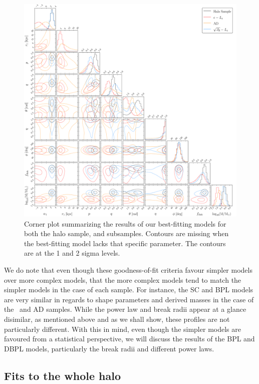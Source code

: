 \begin{figure}
    \centering
    \includegraphics[width=\textwidth]{figure/ch3/posterior.pdf}
    \caption{Corner plot summarizing the results of our best-fitting models for both the halo sample, and \gse subsamples. Contours are missing when the best-fitting model lacks that specific parameter. The contours are at the 1 and 2 sigma levels.}
    \label{ch3:fig:posterior}
\end{figure}

We do note that even though these goodness-of-fit criteria favour simpler models over more complex models, that the more complex models tend to match the simpler models in the case of each sample. For instance, the SC and BPL models are very similar in regards to shape parameters and derived masses in the case of the \eLz\ and AD samples. While the power law and break radii appear at a glance disimilar, as mentioned above and as we shall show, these profiles are not particularly different. With this in mind, even though the simpler models are favoured from a statistical perspective, we will discuss the results of the BPL and DBPL models, particularly the break radii and different power laws.

\subsection{Fits to the whole halo}

